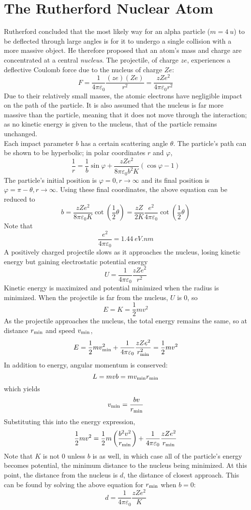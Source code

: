 \documentclass{subfiles}
\begin{document}
	\section{The Rutherford Nuclear Atom}
		Rutherford concluded that the most likely way for an alpha particle (\(m = \SI{4}{u}\)) to be deflected through large angles is for it to undergo a single collision with a more massive object. He therefore proposed that an atom's mass and charge are concentrated at a central \textit{nucleus}. The projectile, of charge \(ze\), experiences a deflective Coulomb force due to the nucleus of charge \(Ze\):
			\[
				F = \frac{1}{4\pi\varepsilon_0}\frac{(ze)(Ze)}{r^2}
					= \frac{zZe^2}{4\pi\varepsilon_0r^2}
					\tag{Rutherford scattering}
			\]
			Due to their relatively small masses, the atomic electrons have negligible impact on the path of the particle. It is also assumed that the nucleus is far more massive than the particle, meaning that it does not move through the interaction; as no kinetic energy is given to the nucleus, that of the particle remains unchanged. \\
		Each impact parameter \(b\) has a certain scattering angle \(\theta\). The particle's path can be shown to be hyperbolic; in polar coordinates \(r\) and \(\varphi\),
			\[\frac{1}{r} = \frac{1}{b}\sin\varphi + \frac{zZe^2}{8\pi\varepsilon_0b^2K}(\cos\varphi - 1) \tag{Rutherford scattering path}\]
			The particle's initial position is \(\varphi = 0, r \to \infty\) and its final position is \(\varphi = \pi - \theta, r \to \infty\). Using these final coordinates, the above equation can be reduced to
			\[
				b = \frac{zZe^2}{8\pi\varepsilon_0K}\cot(\frac{1}{2}\theta)
					= \frac{zZ}{2K}\frac{e^2}{4\pi\varepsilon_0}\cot(\frac{1}{2}\theta)
					\tag{Rutherford scattering path}
			\]
			Note that
			\[\frac{e^2}{4\pi\varepsilon_0} = \SI{1.44}{eV.nm}\]
		A positively charged projectile slows as it approaches the nucleus, losing kinetic energy but gaining electrostatic potential energy
			\[U = \frac{1}{4\pi\varepsilon_0}\frac{zZe^2}{r^2}\]
			Kinetic energy is maximized and potential minimized when the radius is minimized. When the projectile is far from the nucleus, \(U\) is 0, so
			\[
				E = K 
					= \frac{1}{2}mv^2
			\]
			As the projectile approaches the nucleus, the total energy remains the same, so at distance \(r_{\text{min}}\) and speed \(v_{\text{min}}\),
			\[
				E = \frac{1}{2}mv_{\text{min}}^2 + \frac{1}{4\pi\varepsilon_0}\frac{zZe^2}{r_{\text{min}}^2}
					= \frac{1}{2}mv^2
			\]
			In addition to energy, angular momentum is conserved:
			\[
				L = mvb
					= mv_{\text{min}}r_{\text{min}}
			\]
			which yields
			\[v_{\text{min}} = \frac{bv}{r_{\text{min}}}\]
			Substituting this into the energy expression,
			\[\frac{1}{2}mv^2 = \frac{1}{2}m\left(\frac{b^2v^2}{r_{\text{min}}}\right) + \frac{1}{4\pi\varepsilon_0}\frac{zZe^2}{r_{\text{min}}}\]
			Note that \(K\) is not 0 unless \(b\) is as well, in which case all of the particle's energy becomes potential, the minimum distance to the nucleus being minimized. At this point, the distance from the nucleus is \(d\), the distance of closest approach. This can be found by solving the above equation for \(r_{\text{min}}\) when \(b = 0\):
			\[d = \frac{1}{4\pi\varepsilon_0}\frac{zZe^2}{K} \tag{distance of closest approach}\]
\end{document}
